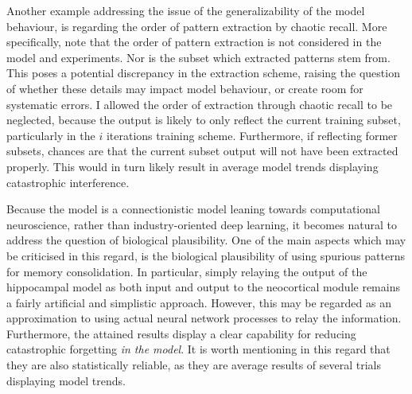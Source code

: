Another example addressing the issue of the generalizability of the model behaviour, is regarding the order of pattern extraction by chaotic recall. More specifically, note that the order of pattern extraction is not considered in the model and experiments. Nor is the subset which extracted patterns stem from. This poses a potential discrepancy in the extraction scheme, raising the question of whether these details may impact model behaviour, or create room for systematic errors. 
I allowed the order of extraction through chaotic recall to be neglected, because the output is likely to only reflect the current training subset, particularly in the $i$ iterations training scheme. Furthermore, if reflecting former subsets, chances are that the current subset output will not have been extracted properly. This would in turn likely result in average model trends displaying catastrophic interference.

Because the model is a connectionistic model leaning towards computational neuroscience, rather than industry-oriented deep learning, it becomes natural to address the question of biological plausibility. One of the main aspects which may be criticised in this regard, is the biological plausibility of using spurious patterns for memory consolidation. In particular, simply relaying the output of the hippocampal model as both input and output to the neocortical module remains a fairly artificial and simplistic approach. However, this may be regarded as an approximation to using actual neural network processes to relay the information. Furthermore, the attained results display a clear capability for reducing catastrophic forgetting \textit{in the model}. It is worth mentioning in this regard that they are also statistically reliable, as they are average results of several trials displaying model trends.








